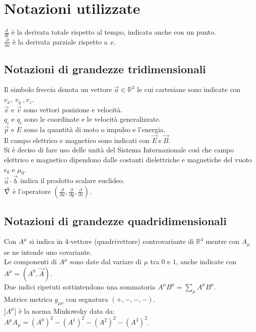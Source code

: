 \section*{Notazioni utilizzate}
\vspace*{\fill}
$\frac{d}{dt}$ è la derivata totale rispetto al tempo, indicata anche con un punto.\\
$\frac{\partial}{\partial x}$ è la derivata parziale rispetto a $x$.\\
\subsection*{Notazioni di grandezze tridimensionali}
Il simbolo freccia denota un vettore $\vec{a}\in\mathbb{R}^3$ le cui cartesiane sono indicate con $v_x,\ v_y\ , v_z$.\\
$\vec{x}$ e $\vec{v}$ sono vettori posizione e velocità.\\
$q_i$ e $\dot q_i$ sono le coordinate e le velocità generalizzate. \\
$\vec{p}$ e $E$ sono la quantità di moto o impulso e l'energia.\\
Il campo elettrico e magnetico sono indicati con $\vec{E}\ \text{e}\ \vec{B}$.\\
Si è deciso di fare uso delle unità del Sistema Internazionale così che campo elettrico e magnetico dipendono dalle costanti dielettriche e magnetiche del vuoto $\epsilon_0$ e $\mu_0$.\\
$\vec a\cdot\vec b$ indica il prodotto scalare euclideo.\\
$\vec{\nabla}$ è l'operatore $(\frac{\partial}{\partial x},\frac{\partial}{\partial y},\frac{\partial}{\partial z})$.\\
\subsection*{Notazioni di grandezze quadridimensionali}
Con $A^\mu$ si indica in 4-vettore (quadrivettore) controvariante di $\mathbb{R}^4$ mentre con $A_\mu$ se ne intende uno covariante.\\
Le componenti di $A^\mu$ sono date dal variare di $\mu$ tra $0$ e $1$, anche indicate con $A^\mu=(A^0,\vec{A})$.\\
Due indici ripetuti sottintendono una sommatoria $A^\mu B^\mu=\sum_\mu A^\mu B^\mu$.\\
Matrice metrica $g_{\mu \nu}$ con segnatura $(+,-,-,-)$.\\
$|A^\mu|$ è la norma Minkowsky data da: $A^\mu A_\mu=(A^0)^2-(A^1)^2-(A^2)^2-(A^3)^2$.\\
